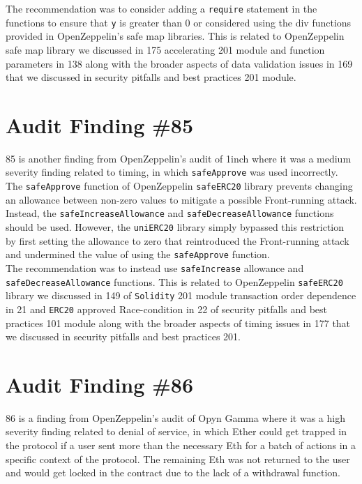 The recommendation was to consider adding a \verb|require| statement in the functions to ensure that \verb|y| is greater than 0 or considered using the div functions provided in OpenZeppelin's safe map libraries. This is related to OpenZeppelin safe map library we discussed in 175 accelerating 201 module and function parameters in 138 along with the broader aspects of data validation issues in 169 that we discussed in security pitfalls and best practices 201 module.

\section{Audit Finding \#85}

85 is another finding from OpenZeppelin's audit of 1inch where it was a medium severity finding related to timing, in which \verb|safeApprove| was used incorrectly. The \verb|safeApprove| function of OpenZeppelin \verb|safeERC20| library prevents changing an allowance between non-zero values to mitigate a possible Front-running attack. Instead, the \verb|safeIncreaseAllowance| and \verb|safeDecreaseAllowance| functions should be used. However, the \verb|uniERC20| library simply bypassed this restriction by first setting the allowance to zero that reintroduced the Front-running attack and undermined the value of using the \verb|safeApprove| function.\\

The recommendation was to instead use \verb|safeIncrease| allowance and \verb|safeDecreaseAllowance| functions. This is related to OpenZeppelin \verb|safeERC20| library we discussed in 149 of \verb|Solidity| 201 module transaction order dependence in 21 and \verb|ERC20| approved Race-condition in 22 of security pitfalls and best practices 101 module along with the broader aspects of timing issues in 177 that we discussed in security pitfalls and best practices 201.

\section{Audit Finding \#86}

86 is a finding from OpenZeppelin's audit of Opyn Gamma where it was a high severity finding related to denial of service, in which Ether could get trapped in the protocol if a user sent more than the necessary Eth for a batch of actions in a specific context of the protocol. The remaining Eth was not returned to the user and would get locked in the contract due to the lack of a withdrawal function.\\

